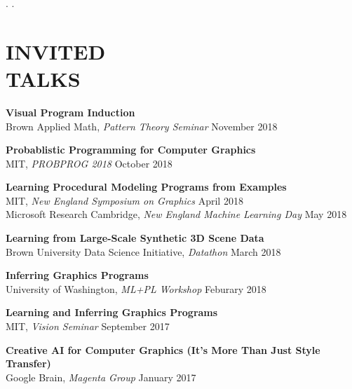 \documentclass[line,margin]{res}
\begin{document}
\begin{resume}
. 
.




\section{INVITED\\TALKS}

\newcommand{\talktitle}[1]{
	\textbf{#1}
}
\newcommand{\talk}[3]{
	#1, \emph{#2} \hfill #3
}

\talktitle{Visual Program Induction}\\
\talk
	{Brown Applied Math}
	{Pattern Theory Seminar}
	{November 2018}

\talktitle{Probablistic Programming for Computer Graphics}\\
\talk
	{MIT}
	{PROBPROG 2018}
	{October 2018}

\talktitle{Learning Procedural Modeling Programs from Examples}\\
\talk
	{MIT}
	{New England Symposium on Graphics}
	{April 2018}\\
\talk
	{Microsoft Research Cambridge}
	{New England Machine Learning Day}
	{May 2018}

\talktitle{Learning from Large-Scale Synthetic 3D Scene Data}\\
\talk
	{Brown University Data Science Initiative}
	{Datathon}
	{March 2018}

\talktitle{Inferring Graphics Programs}\\
\talk
	{University of Washington}
	{ML+PL Workshop}
	{Feburary 2018}

\talktitle{Learning and Inferring Graphics Programs}\\
\talk
	{MIT}
	{Vision Seminar}
	{September 2017}

\talktitle{Creative AI for Computer Graphics (It's More Than Just Style Transfer)}\\
\talk
	{Google Brain}
	{Magenta Group}
	{January 2017}


\end{resume}
\end{document}
